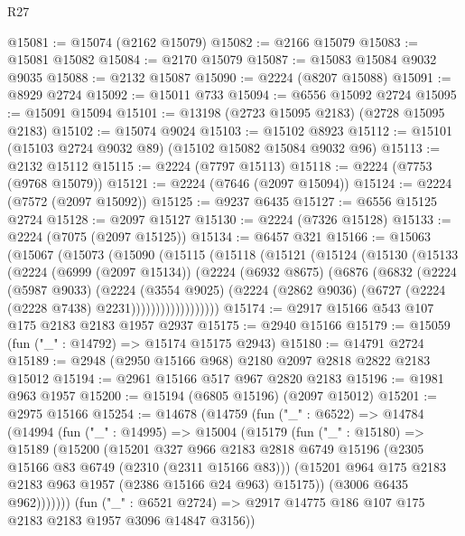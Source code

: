 \begin{lexlean}{R27}
\begin{coremodule}
@15081 := @15074 (@2162 @15079)
@15082 := @2166 @15079
@15083 := @15081 @15082
@15084 := @2170 @15079
@15087 := @15083 @15084 @9032 @9035
@15088 := @2132 @15087
@15090 := @2224 (@8207 @15088)
@15091 := @8929 @2724
@15092 := @15011 @733
@15094 := @6556 @15092 @2724
@15095 := @15091 @15094
@15101 := @13198 (@2723 @15095 @2183) (@2728 @15095 @2183)
@15102 := @15074 @9024
@15103 := @15102 @8923
@15112 := @15101 (@15103 @2724 @9032 @89) (@15102 @15082 @15084 @9032 @96)
@15113 := @2132 @15112
@15115 := @2224 (@7797 @15113)
@15118 := @2224 (@7753 (@9768 @15079))
@15121 := @2224 (@7646 (@2097 @15094))
@15124 := @2224 (@7572 (@2097 @15092))
@15125 := @9237 @6435
@15127 := @6556 @15125 @2724
@15128 := @2097 @15127
@15130 := @2224 (@7326 @15128)
@15133 := @2224 (@7075 (@2097 @15125))
@15134 := @6457 @321
@15166 := @15063
    (@15067
      (@15073
        (@15090
          (@15115
            (@15118
              (@15121
                (@15124
                  (@15130
                    (@15133
                      (@2224
                        (@6999 (@2097 @15134))
                        (@2224
                          (@6932 @8675)
                          (@6876
                            (@6832
                              (@2224
                                (@5987 @9033)
                                (@2224
                                  (@3554 @9025)
                                  (@2224
                                    (@2862 @9036)
                                    (@6727 (@2224 (@2228 @7438) @2231))))))))))))))))))
@15174 := @2917 @15166 @543 @107 @175 @2183 @2183 @1957 @2937
@15175 := @2940 @15166
@15179 := @15059 (fun ("_" : @14792) => @15174 @15175 @2943)
@15180 := @14791 @2724
@15189 := @2948 (@2950 @15166 @968) @2180 @2097 @2818 @2822 @2183 @15012
@15194 := @2961 @15166 @517 @967 @2820 @2183
@15196 := @1981 @963 @1957
@15200 := @15194 (@6805 @15196) (@2097 @15012)
@15201 := @2975 @15166
@15254 := @14678
    (@14759
      (fun ("_" : @6522) =>
      @14784
        (@14994
          (fun ("_" : @14995) =>
          @15004
            (@15179
              (fun ("_" : @15180) =>
              @15189
                (@15200
                  (@15201
                    @327
                    @966
                    @2183
                    @2818
                    @6749
                    @15196
                    (@2305 @15166 @83 @6749 (@2310 (@2311 @15166 @83)))
                    (@15201 @964 @175 @2183 @2183 @963 @1957 (@2386 @15166 @24 @963) @15175))
                  (@3006 @6435 @962)))))))
      (fun ("_" : @6521 @2724) => @2917 @14775 @186 @107 @175 @2183 @2183 @1957 @3096 @14847 @3156))

\end{coremodule}
\end{lexlean}

